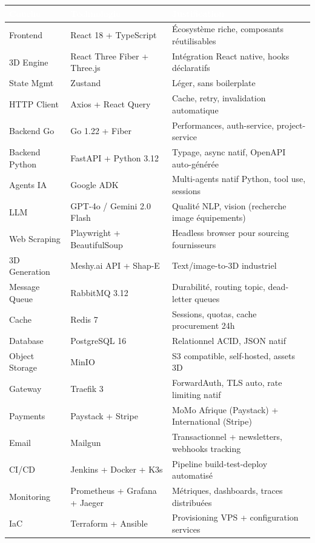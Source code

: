 \documentclass[12pt,a4paper]{article}
\begin{document}
\begin{tabularx}{\textwidth}{|l|l|X|}
\hline
\rowcolor{tablehead}\textcolor{white}{\textbf{Couche}} & \textcolor{white}{\textbf{Technologie}} & \textcolor{white}{\textbf{Justification}} \\
\hline
Frontend & React 18 + TypeScript & Écosystème riche, composants réutilisables \\
\hline
\rowcolor{tablerow}
3D Engine & React Three Fiber + Three.js & Intégration React native, hooks déclaratifs \\
\hline
State Mgmt & Zustand & Léger, sans boilerplate \\
\hline
\rowcolor{tablerow}
HTTP Client & Axios + React Query & Cache, retry, invalidation automatique \\
\hline
Backend Go & Go 1.22 + Fiber & Performances, auth-service, project-service \\
\hline
\rowcolor{tablerow}
Backend Python & FastAPI + Python 3.12 & Typage, async natif, OpenAPI auto-générée \\
\hline
Agents IA & Google ADK & Multi-agents natif Python, tool use, sessions \\
\hline
\rowcolor{tablerow}
LLM & GPT-4o / Gemini 2.0 Flash & Qualité NLP, vision (recherche image équipements) \\
\hline
Web Scraping & Playwright + BeautifulSoup & Headless browser pour sourcing fournisseurs \\
\hline
\rowcolor{tablerow}
3D Generation & Meshy.ai API + Shap-E & Text/image-to-3D industriel \\
\hline
Message Queue & RabbitMQ 3.12 & Durabilité, routing topic, dead-letter queues \\
\hline
\rowcolor{tablerow}
Cache & Redis 7 & Sessions, quotas, cache procurement 24h \\
\hline
Database & PostgreSQL 16 & Relationnel ACID, JSON natif \\
\hline
\rowcolor{tablerow}
Object Storage & MinIO & S3 compatible, self-hosted, assets 3D \\
\hline
Gateway & Traefik 3 & ForwardAuth, TLS auto, rate limiting natif \\
\hline
\rowcolor{tablerow}
Payments & Paystack + Stripe & MoMo Afrique (Paystack) + International (Stripe) \\
\hline
Email & Mailgun & Transactionnel + newsletters, webhooks tracking \\
\hline
\rowcolor{tablerow}
CI/CD & Jenkins + Docker + K3s & Pipeline build-test-deploy automatisé \\
\hline
Monitoring & Prometheus + Grafana + Jaeger & Métriques, dashboards, traces distribuées \\
\hline
\rowcolor{tablerow}
IaC & Terraform + Ansible & Provisioning VPS + configuration services \\
\hline
\end{tabularx}
\end{document}
